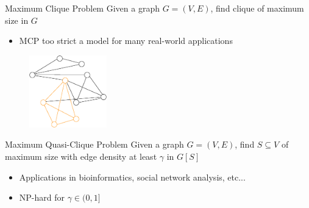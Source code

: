 \documentclass{beamer}
\begin{document}
\begin{frame}{Maximum Clique Problem}
    Given a graph $G = (V,E)$, find clique of maximum size in $G$
    \begin{itemize}
        \item MCP too strict a model for many real-world applications
    \end{itemize}
    \begin{figure}
        \centering
        \includegraphics[width=0.3\textwidth]{graphics/graph1-clique.eps}
    \end{figure}
\end{frame} 

\begin{frame}{Maximum Quasi-Clique Problem}
    Given a graph $G = (V,E)$, find $S \subseteq V$ of maximum size with edge density at least $\gamma$ in $G[S]$
    \begin{itemize}
        \item<1-> Applications in bioinformatics, social network analysis, etc...
        \item<2-> NP-hard for $\gamma \in (0,1]$ \cite{pattillo_maximum_2013}
    \end{itemize}
\end{frame}
\end{document}
